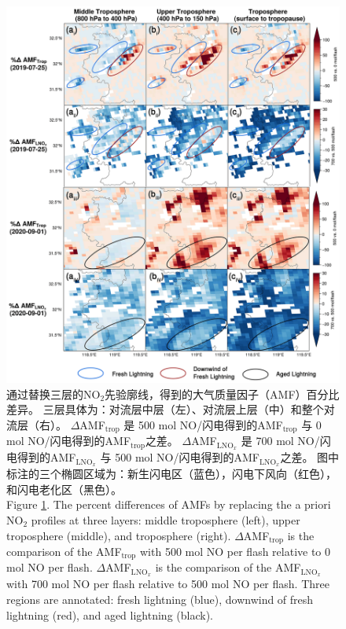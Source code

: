 \begin{figure}[H]
    \centering
    \includegraphics[width=13cm]{./figures/china_s5p_amf_diff.png}
    \caption{
    通过替换三层的NO$_2$先验廓线，得到的大气质量因子（AMF）百分比差异。
    三层具体为：对流层中层（左）、对流层上层（中）和整个对流层（右）。
     $\Delta$AMF$_\textrm{trop}$ 是 500 mol NO/闪电得到的AMF$_\textrm{trop}$ 与 0 mol NO/闪电得到的AMF$_\textrm{trop}$之差。
     $\Delta$AMF$_\textrm{LNO$_x$}$ 是 700 mol NO/闪电得到的AMF$_\textrm{LNO$_x$}$ 与 500 mol NO/闪电得到的AMF$_\textrm{LNO$_x$}$之差。
     图中标注的三个椭圆区域为：新生闪电区（蓝色），闪电下风向（红色），和闪电老化区（黑色）。\\
    Figure \ref{fig:china_s5p_amf_diff}. The percent differences of AMFs by replacing the a priori NO$_2$ profiles at three layers:
    middle troposphere (left), upper troposphere (middle), and troposphere (right).
    $\Delta$AMF$_\textrm{trop}$ is the comparison of the AMF$_\textrm{trop}$ with 500 mol NO per flash relative to 0 mol NO per flash.
    $\Delta$AMF$_\textrm{LNO$_x$}$ is the comparison of the AMF$_\textrm{LNO$_x$}$ with 700 mol NO per flash relative to 500 mol NO per flash.
    Three regions are annotated: fresh lightning (blue),
    downwind of fresh lightning (red),
    and aged lightning (black).
    }
    \label{fig:china_s5p_amf_diff}
\end{figure}


